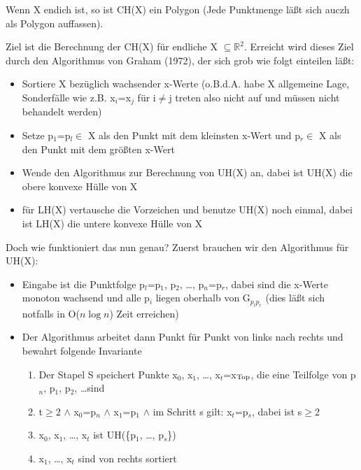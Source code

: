 \begin{satz}
Wenn X endich ist, so ist CH(X) ein Polygon (Jede Punktmenge läßt sich auczh als Polygon auffassen).
\end{satz}

Ziel ist die Berechnung der CH(X) für endliche X $\subseteq \mathbb{R}^2$. Erreicht wird dieses Ziel durch den Algorithmus von Graham
(1972), der sich grob wie folgt einteilen läßt:

\begin{itemize}
\item Sortiere X bezüglich wachsender x-Werte (o.B.d.A. habe X allgemeine Lage, Sonderfälle wie z.B. x$_i$=x$_j$ für i$\neq$j treten
also nicht auf und müssen nicht behandelt werden)
\item Setze p$_1$=p$_l \in$ X als den Punkt mit dem kleinsten x-Wert und p$_r \in$ X als den Punkt mit dem größten x-Wert 
\item Wende den Algorithmus zur Berechnung von UH(X) an, dabei ist UH(X) die obere konvexe Hülle von X
\item für LH(X) vertausche die Vorzeichen und benutze UH(X) noch einmal, dabei ist LH(X) die untere konvexe Hülle von X
\end{itemize}

\begin{figure}[H]
  \centering
  \label{031203b}
\end{figure}

Doch wie funktioniert das nun genau? Zuerst brauchen wir den Algorithmus für UH(X):
\begin{itemize}
\item Eingabe ist die Punktfolge p$_l$=p$_1$, p$_2$, \ldots, p$_n$=p$_r$, dabei sind die x-Werte monoton wachsend und alle p$_i$ liegen
oberhalb von G$_{p_l p_r}$ (dies läßt sich notfalls in O($n \log n$) Zeit erreichen)
\item Der Algorithmus arbeitet dann Punkt für Punkt von links nach rechts und bewahrt folgende Invariante
  \begin{enumerate}
  \item Der Stapel S speichert Punkte x$_0$, x$_1$, \ldots, x$_t$=x$_{\textnormal{Top}}$, die eine Teilfolge von p$_n$, p$_1$, p$_2$, \ldots sind
  \item t$\geq$2 $\wedge$ x$_0$=p$_n$ $\wedge$ x$_1$=p$_1$ $\wedge$ im Schritt s gilt: x$_t$=p$_s$, dabei ist s$\geq$2
  \item x$_0$, x$_1$, \ldots, x$_t$ ist UH(\{p$_1$, \ldots, p$_s$\})
  \item x$_1$, \ldots, x$_t$ sind von rechts sortiert
  \end{enumerate}
\end{itemize}

